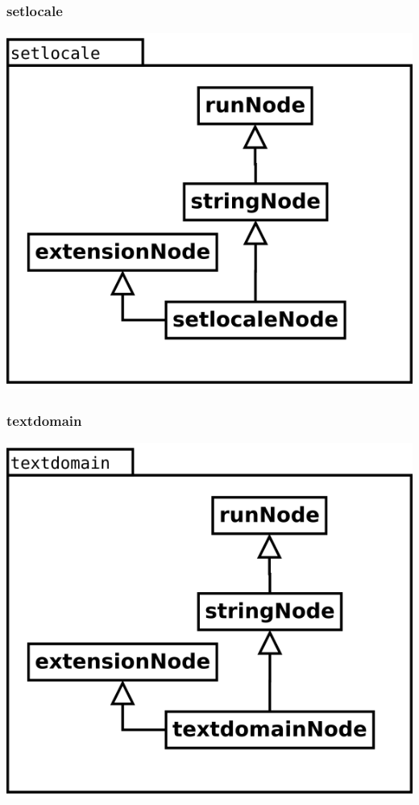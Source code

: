\subsubsection {setlocale}
\begin{center}
\includegraphics[scale=0.4]{setlocale.png} \\
\end{center}

\subsubsection {textdomain}
\begin{center}
\includegraphics[scale=0.4]{textdomain.png} \\
\end{center}

